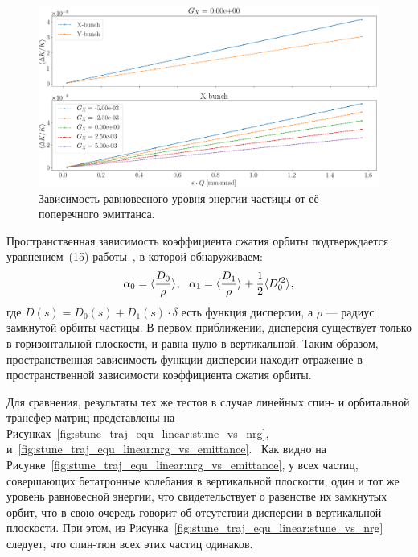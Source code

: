 \begin{figure}[H]
	\centering
	\includegraphics[height=.3\paperheight]{images/stune_traj_equ/part1/equ_energy_vs_emittance}
	\caption{Зависимость равновесного уровня энергии частицы от её поперечного эмиттанса.\label{fig:equ_nrg_vs_emittance}}
\end{figure}

Пространственная зависимость коэффициента сжатия орбиты подтверждается уравнением~(15) работы~\cite{Senichev:IPAC13}, в которой обнаруживаем:
\[
\alpha_0 = \avg{\frac{D_0}{\rho}},~~ \alpha_1 = \avg{\frac{D_1}{\rho}} + \frac12\avg{D_0'^2},
\]
где $D(s) = D_0(s) + D_1(s)\cdot \delta$  есть функция дисперсии, а $\rho$ --- радиус замкнутой орбиты частицы.
В первом приближении, дисперсия существует только в горизонтальной плоскости, и равна нулю в вертикальной. Таким образом, пространственная зависимость функции дисперсии находит отражение в пространственной зависимости коэффициента сжатия орбиты.

Для сравнения, результаты тех же тестов в случае линейных спин- и орбитальной трансфер матриц представлены на Рисунках~\ref{fig:stune_traj_equ_linear:stune_vs_nrg}, и~\ref{fig:stune_traj_equ_linear:nrg_vs_emittance}.  Как видно на Рисунке~\ref{fig:stune_traj_equ_linear:nrg_vs_emittance}, у всех частиц, совершающих бетатронные колебания в вертикальной плоскости, один и тот же уровень равновесной энергии, что свидетельствует о равенстве их замкнутых орбит, что в свою очередь говорит об отсутствии дисперсии в вертикальной плоскости. При этом, из Рисунка~\ref{fig:stune_traj_equ_linear:stune_vs_nrg} следует, что спин-тюн всех этих частиц одинаков.

